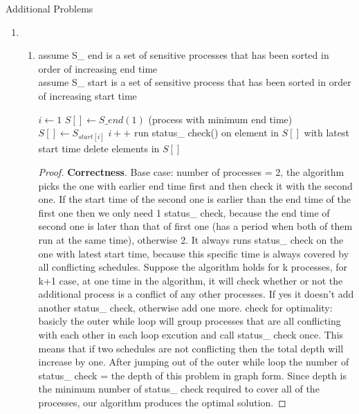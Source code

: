 \documentclass[paper=a4, fontsize=11pt]{scrartcl} %
\makeatletter
\numberwithin{equation}{section} %
\numberwithin{figure}{section} %
\numberwithin{table}{section} %
\renewcommand{\section}{\@startsection{section}{1}{0mm}
  {-\baselineskip}{0.5 \baselineskip}{\bf\leftline}}
\newenvironment{myproof}{\begin{proof}\setlength{\parindent}{2em}}{\end{proof}}
\makeatother
\begin{document}
\section{Additional Problems}
\begin{enumerate}
\item %
\begin{enumerate}
\item
\begin{algorithm}
assume S\_ end is a set of sensitive processes that has been sorted in order of increasing end time\\
assume S\_ start is a set of sensitive process that has been sorted in order of increasing start time
\begin{algorithmic}
\STATE $i\leftarrow 1$
\STATE $S[] \leftarrow S\_ end(1)$ (process with minimum end time)
	\STATE $S[]\leftarrow S_{start[i]}$
	\STATE $i++$
\ENDWHILE
\STATE run status\_ check() on element in $S[]$ with latest start time
\STATE delete elements in $S[]$
\ENDWHILE
\end{algorithmic}
\end{algorithm}
\begin{myproof}
\textbf{Correctness}. 
Base case: number of processes  = 2, the algorithm picks the one
with earlier end time first and then check it with the second one.
If the start time of the second one is earlier than the end time of the first one then we only need 1 status\_ check, because the end time of second one is later than that of first one (has a period when both of them run at the same time), otherwise 2. It always runs status\_ check on the one with latest start time, because this specific time is always covered by all conflicting schedules.  
Suppose the algorithm holds for k processes, for k+1 case, at one time in the algorithm, it will check whether or not the additional process is a conflict of any other processes. If yes it doesn't add another status\_ check, otherwise add one more.
check for optimality: basicly the outer while loop will group processes that are all conflicting with each other in each loop excution and call status\_ check once. This means that if two schedules are not conflicting then the total depth will increase by one. After jumping out of the outer while loop the number of status\_ check = the depth of this problem in graph form. Since depth is the minimum number of status\_ check required to cover all of the processes, our algorithm produces the optimal solution.


\end{myproof}
\end{enumerate}
\end{enumerate}
\end{document}
